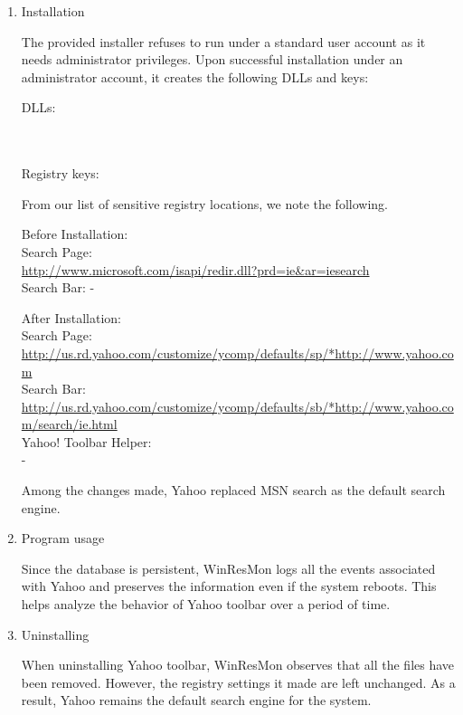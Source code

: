 \begin{enumerate}
\item Installation

The provided installer refuses to run under a standard user account as it
needs administrator privileges. Upon successful installation under an
administrator account, it creates the following DLLs and keys:

\noindent DLLs:\\
\\
\\

\noindent Registry keys:\\

 From our list of sensitive registry locations, we note the following.

\noindent Before Installation: \\
Search Page: \\
\url{http://www.microsoft.com/isapi/redir.dll?prd=ie&ar=iesearch} \\
Search Bar:  -

\noindent After Installation: \\
Search Page: \\
\url{http://us.rd.yahoo.com/customize/ycomp/defaults/sp/*http://www.yahoo.com} \\
Search Bar: \\
\url{http://us.rd.yahoo.com/customize/ycomp/defaults/sb/*http://www.yahoo.com/search/ie.html} \\
Yahoo! Toolbar Helper: \\
 -

Among the changes made, Yahoo replaced MSN search as the default search
engine.

\item Program usage

Since the database is persistent, WinResMon logs all the events associated with
Yahoo and preserves the information even if the system reboots.  This helps
analyze the behavior of Yahoo toolbar over a period of time.

\item Uninstalling

When uninstalling Yahoo toolbar, WinResMon observes that all the files have been
removed.  However, the registry settings it made are left unchanged. As a
result, Yahoo remains the default search engine for the system.

\end{enumerate}


